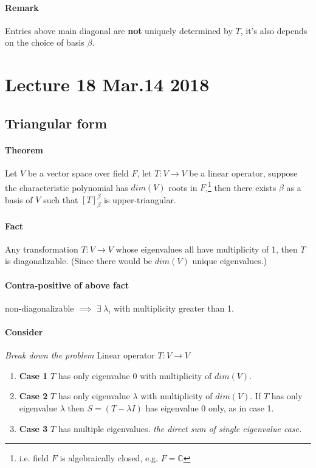 \documentclass[11pt]{article}
\newcommand{\trans}[3]{{#1}: {#2} \to {#3}}
\newcommand{\tmat}[3]{[{#1}]_{{#2}}^{{#3}}}
\newcommand{\theorem}[0]{\paragraph{Theorem}}
\newcommand{\C}[0]{\mathbb{C}}
\begin{document}
	\paragraph{Remark} Entries above main diagonal are \textbf{not} uniquely determined by $T$, it's also depends on the choice of basis $\beta$.
	
	
	\section{Lecture 18 Mar.14 2018}
	\subsection{Triangular form}
	
	\theorem Let $V$ be a vector space over field $F$, let $\trans{T}{V}{V}$ be a linear operator, suppose the characteristic polynomial has $dim(V)$ roots in $F$,\footnote{i.e. field $F$ is algebraically closed, e.g. $F = \C$} then there exists $\beta$ as a basis of $V$ such that $\tmat{T}{\beta}{\beta}$ is upper-triangular.
	
	\paragraph{Fact} Any transformation $\trans{T}{V}{V}$ whose eigenvalues all have multiplicity of 1, then $T$ is diagonalizable. (Since there would be $dim(V)$ unique eigenvalues.)
	\paragraph{Contra-positive of above fact} non-diagonalizable $\implies $ $\exists\ \lambda_i$ with multiplicity greater than 1.
	
	\paragraph{Consider} \emph{Break down the problem} Linear operator $\trans{T}{V}{V}$ 
	\begin{enumerate}
		\item \textbf{Case 1} $T$ has only eigenvalue 0 with multiplicity of $dim(V)$.
		\item \textbf{Case 2} $T$ has only eigenvalue $\lambda$ with multiplicity of $dim(V)$. If $T$ has only eigenvalue $\lambda$ then $S = (T - \lambda I)$ has eigenvalue 0 only, as in case 1.
		\item \textbf{Case 3} $T$ has multiple eigenvalues.\emph{ the direct sum of single eigenvalue case.}
	\end{enumerate} 
	
\end{document}
